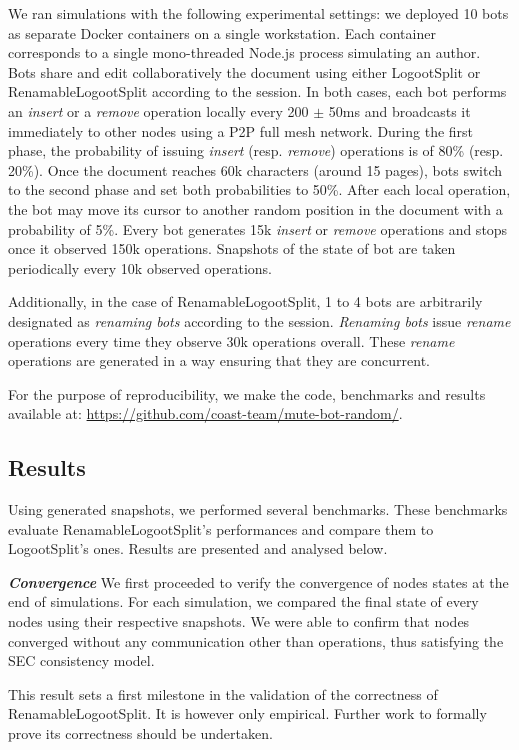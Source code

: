 \documentclass[10pt,journal,compsoc]{IEEEtran}
\newcommand{\headerparagraph}[1]{\textbf{\emph{#1}}\quad}
\begin{document}
We ran simulations with the following experimental settings: we deployed 10 bots as separate Docker containers on a single workstation.
Each container corresponds to a single mono-threaded Node.js process simulating an author.
Bots share and edit collaboratively the document using either LogootSplit or RenamableLogootSplit according to the session.
In both cases, each bot performs an \emph{insert} or a \emph{remove} operation locally every 200 $\pm$ 50ms and broadcasts it immediately to other nodes using a \ac{P2P} full mesh network.
During the first phase, the probability of issuing \emph{insert} (resp. \emph{remove}) operations is of 80\% (resp. 20\%).
Once the document reaches 60k characters (around 15 pages), bots switch to the second phase and set both probabilities to 50\%.
After each local operation, the bot may move its cursor to another random position in the document with a probability of 5\%.
Every bot generates 15k \emph{insert} or \emph{remove} operations and stops once it observed 150k operations.
Snapshots of the state of bot are taken periodically every 10k observed operations.

Additionally, in the case of RenamableLogootSplit, 1 to 4 bots are arbitrarily designated as \emph{renaming bots} according to the session.
\emph{Renaming bots} issue \emph{rename} operations every time they observe 30k operations overall.
These \emph{rename} operations are generated in a way ensuring that they are concurrent.

For the purpose of reproducibility, we make the code, benchmarks and results available at: \url{https://github.com/coast-team/mute-bot-random/}.

\subsection{Results}

Using generated snapshots, we performed several benchmarks.
These benchmarks evaluate RenamableLogootSplit's performances and compare them to LogootSplit's ones.
Results are presented and analysed below.

\headerparagraph{Convergence}
%
We first proceeded to verify the convergence of nodes states at the end of simulations.
For each simulation, we compared the final state of every nodes using their respective snapshots.
We were able to confirm that nodes converged without any communication other than operations, thus satisfying the \ac{SEC} consistency model.

This result sets a first milestone in the validation of the correctness of RenamableLogootSplit.
It is however only empirical.
Further work to formally prove its correctness should be undertaken.
\end{document}
